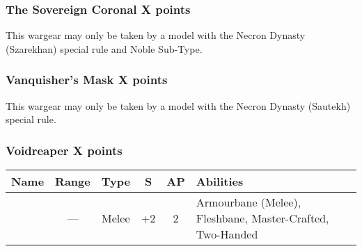 \subsubsection[The Sovereign Coronal]{The Sovereign Coronal \dotfill X points}
This wargear may only be taken by a model with the Necron Dynasty (Szarekhan) special rule and Noble Sub-Type.

\subsubsection[Vanquisher's Mask]{Vanquisher's Mask \dotfill X points}
This wargear may only be taken by a model with the Necron Dynasty (Sautekh) special rule.

\subsubsection[Voidreaper]{Voidreaper \dotfill X points}

\label{Voidreaper}
\noindent
\begin{NiceTabular}{m{130 pt} *{4}{c} >{\raggedright\arraybackslash}p{240pt}}
	Name & Range & Type & S & AP & Abilities \\
	\hline
	 & — & Melee & +2 & 2 & Armourbane (Melee), Fleshbane, Master-Crafted, Two-Handed \\
\end{NiceTabular}
